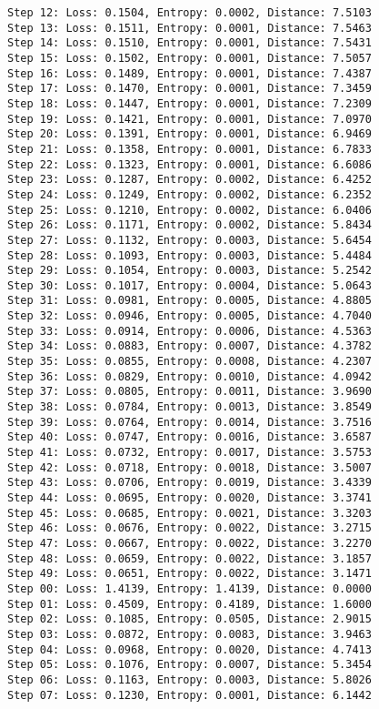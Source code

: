 \documentclass[11pt]{article}
\begin{document}
\begin{Verbatim}[commandchars=\\\{\}]
Step 12: Loss: 0.1504, Entropy: 0.0002, Distance: 7.5103
Step 13: Loss: 0.1511, Entropy: 0.0001, Distance: 7.5463
Step 14: Loss: 0.1510, Entropy: 0.0001, Distance: 7.5431
Step 15: Loss: 0.1502, Entropy: 0.0001, Distance: 7.5057
Step 16: Loss: 0.1489, Entropy: 0.0001, Distance: 7.4387
Step 17: Loss: 0.1470, Entropy: 0.0001, Distance: 7.3459
Step 18: Loss: 0.1447, Entropy: 0.0001, Distance: 7.2309
Step 19: Loss: 0.1421, Entropy: 0.0001, Distance: 7.0970
Step 20: Loss: 0.1391, Entropy: 0.0001, Distance: 6.9469
Step 21: Loss: 0.1358, Entropy: 0.0001, Distance: 6.7833
Step 22: Loss: 0.1323, Entropy: 0.0001, Distance: 6.6086
Step 23: Loss: 0.1287, Entropy: 0.0002, Distance: 6.4252
Step 24: Loss: 0.1249, Entropy: 0.0002, Distance: 6.2352
Step 25: Loss: 0.1210, Entropy: 0.0002, Distance: 6.0406
Step 26: Loss: 0.1171, Entropy: 0.0002, Distance: 5.8434
Step 27: Loss: 0.1132, Entropy: 0.0003, Distance: 5.6454
Step 28: Loss: 0.1093, Entropy: 0.0003, Distance: 5.4484
Step 29: Loss: 0.1054, Entropy: 0.0003, Distance: 5.2542
Step 30: Loss: 0.1017, Entropy: 0.0004, Distance: 5.0643
Step 31: Loss: 0.0981, Entropy: 0.0005, Distance: 4.8805
Step 32: Loss: 0.0946, Entropy: 0.0005, Distance: 4.7040
Step 33: Loss: 0.0914, Entropy: 0.0006, Distance: 4.5363
Step 34: Loss: 0.0883, Entropy: 0.0007, Distance: 4.3782
Step 35: Loss: 0.0855, Entropy: 0.0008, Distance: 4.2307
Step 36: Loss: 0.0829, Entropy: 0.0010, Distance: 4.0942
Step 37: Loss: 0.0805, Entropy: 0.0011, Distance: 3.9690
Step 38: Loss: 0.0784, Entropy: 0.0013, Distance: 3.8549
Step 39: Loss: 0.0764, Entropy: 0.0014, Distance: 3.7516
Step 40: Loss: 0.0747, Entropy: 0.0016, Distance: 3.6587
Step 41: Loss: 0.0732, Entropy: 0.0017, Distance: 3.5753
Step 42: Loss: 0.0718, Entropy: 0.0018, Distance: 3.5007
Step 43: Loss: 0.0706, Entropy: 0.0019, Distance: 3.4339
Step 44: Loss: 0.0695, Entropy: 0.0020, Distance: 3.3741
Step 45: Loss: 0.0685, Entropy: 0.0021, Distance: 3.3203
Step 46: Loss: 0.0676, Entropy: 0.0022, Distance: 3.2715
Step 47: Loss: 0.0667, Entropy: 0.0022, Distance: 3.2270
Step 48: Loss: 0.0659, Entropy: 0.0022, Distance: 3.1857
Step 49: Loss: 0.0651, Entropy: 0.0022, Distance: 3.1471
Step 00: Loss: 1.4139, Entropy: 1.4139, Distance: 0.0000
Step 01: Loss: 0.4509, Entropy: 0.4189, Distance: 1.6000
Step 02: Loss: 0.1085, Entropy: 0.0505, Distance: 2.9015
Step 03: Loss: 0.0872, Entropy: 0.0083, Distance: 3.9463
Step 04: Loss: 0.0968, Entropy: 0.0020, Distance: 4.7413
Step 05: Loss: 0.1076, Entropy: 0.0007, Distance: 5.3454
Step 06: Loss: 0.1163, Entropy: 0.0003, Distance: 5.8026
Step 07: Loss: 0.1230, Entropy: 0.0001, Distance: 6.1442

\end{Verbatim}
\end{document}
